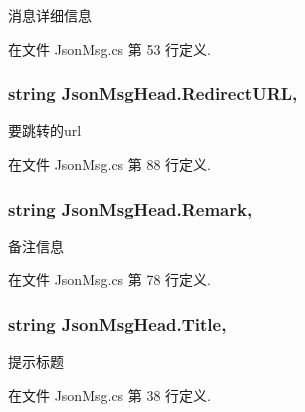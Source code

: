 消息详细信息 



在文件 Json\-Msg.\-cs 第 53 行定义.

\hypertarget{class_json_msg_head_ab6ddde17d5cbb264e0641b09f19e9c22}{
\subsubsection[{Redirect\-U\-R\-L}]{\setlength{\rightskip}{0pt plus 5cm}string Json\-Msg\-Head.\-Redirect\-U\-R\-L\hspace{0.3cm}{\ttfamily [get]}, {\ttfamily [set]}}}\label{class_json_msg_head_ab6ddde17d5cbb264e0641b09f19e9c22}


要跳转的url 



在文件 Json\-Msg.\-cs 第 88 行定义.

\hypertarget{class_json_msg_head_ad1b553e80f96e9a7bb417db79179b2b1}{
\subsubsection[{Remark}]{\setlength{\rightskip}{0pt plus 5cm}string Json\-Msg\-Head.\-Remark\hspace{0.3cm}{\ttfamily [get]}, {\ttfamily [set]}}}\label{class_json_msg_head_ad1b553e80f96e9a7bb417db79179b2b1}


备注信息 



在文件 Json\-Msg.\-cs 第 78 行定义.

\hypertarget{class_json_msg_head_a49bdf4bc535173ee33374933a514e285}{
\subsubsection[{Title}]{\setlength{\rightskip}{0pt plus 5cm}string Json\-Msg\-Head.\-Title\hspace{0.3cm}{\ttfamily [get]}, {\ttfamily [set]}}}\label{class_json_msg_head_a49bdf4bc535173ee33374933a514e285}


提示标题 



在文件 Json\-Msg.\-cs 第 38 行定义.

